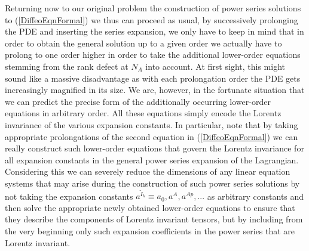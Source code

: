 Returning now to our original problem the construction of power series solutions to (\ref{DiffeoEqnFormal}) we thus can proceed as usual, by successively prolonging the PDE and inserting the series expansion, we only have to keep in mind that in order to obtain the general solution up to a given order we actually have to prolong to one order higher in order to take the additional lower-order equations stemming from the rank defect at $N_A$ into account.  At first sight, this might sound like a massive disadvantage as with each prolongation order the PDE gets increasingly magnified in its size. We are, however, in the fortunate situation that we can predict the precise form of the additionally occurring lower-order equations in arbitrary order. All these equations simply encode the Lorentz invariance of the various expansion constants. In particular, note that by taking appropriate prolongations of the second equation in (\ref{DiffeoEqnFormal}) we can really construct such lower-order equations that govern the Lorentz invariance for all expansion constants in the general power series expansion of the Lagrangian. 
Considering this we can severely reduce the dimensions of any linear equation systems that may arise during the construction of such power series solutions by not taking the expansion constants $a^{\tilde{I}_k} \equiv a_0, a^A, a^{Ap},...$ as arbitrary constants and then solve the appropriate newly obtained lower-order equations to ensure that they describe the components of Lorentz invariant tensors, but by including from the very beginning only such expansion coefficients in the power series that are Lorentz invariant.


